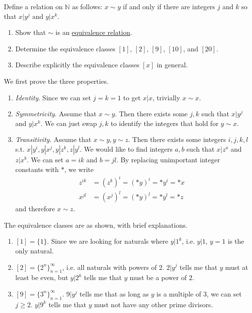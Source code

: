   \begin{exercise}
    Define a relation on $\mathbb{N}$ as follows: $x \sim y$ if and only if there are integers $j$ and $k$ so that $x|y^j$ and $y|x^k$.
    \begin{enumerate}
      \item[(a)] Show that $\sim$ is an \hyperref[def:equivalence_relation]{equivalence relation}.
      \item[(b)] Determine the equivalence classes $[1]$, $[2]$, $[9]$, $[10]$, and $[20]$.
      \item[(c)] Describe explicitly the equivalence classes $[x]$ in general.
    \end{enumerate}
  \end{exercise}
  \begin{solution}
    We first prove the three properties. 
    \begin{enumerate}
      \item \textit{Identity}. Since we can set $j = k = 1$ to get $x | x$, trivially $x \sim x$. 
      \item \textit{Symmetricity}. Assume that $x \sim y$. Then there exists some $j, k$ such that $x | y^j$ and $y | x^k$. We can just swap $j, k$ to identify the integers that hold for $y \sim x$. 
      \item \textit{Transitivity}. Assume that $x \sim y, y \sim z$. Then there exists some integers $i, j, k, l$ s.t. $x | y^i, y | x^j, y | z^k, z | y^l$. We would like to find integers $a, b$ such that $x | z^a$ and $z | x^b$. We can set $a = ik$ and $b = jl$. By replacing unimportant integer constants with $\ast$, we write 
      \begin{align}
        z^{ik} & = (z^k)^i = (\ast y)^i = \ast y^i = \ast x \\
        x^{jl} & = (x^j)^l = (\ast y)^l = \ast y^l = \ast z
      \end{align}
      and therefore $x \sim z$. 
    \end{enumerate}
    The equivalence classes are as shown, with brief explanations. 
    \begin{enumerate}
      \item $[1] = \{1\}$. Since we are looking for naturals where $y | 1^k$, i.e. $y | 1$, $y = 1$ is the only natural. 
      \item $[2] = \{2^n\}_{n=1}^\infty$, i.e. all naturals with powers of $2$. $2 | y^j$ tells me that $y$ must at least be even, but $y | 2^k$ tells me that $y$ must be a power of $2$. 
      \item $[9] = \{3^n\}_{n=1}^\infty$. $9 | y^j$ tells me that as long as $y$ is a multiple of $3$, we can set $j \geq 2$. $y | 9^k$ tells me that $y$ must not have any other prime divisors. 

\end{enumerate}
\end{solution}
